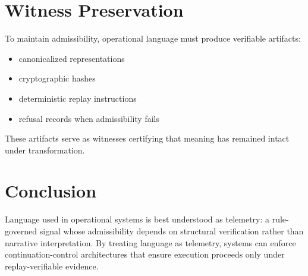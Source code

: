 \documentclass[11pt]{article}
\begin{document}
\section{Witness Preservation}

To maintain admissibility, operational language must produce verifiable artifacts:

\begin{itemize}
\item canonicalized representations
\item cryptographic hashes
\item deterministic replay instructions
\item refusal records when admissibility fails
\end{itemize}

These artifacts serve as witnesses certifying that meaning has remained intact under transformation.

\section{Conclusion}

Language used in operational systems is best understood as telemetry: a rule-governed signal whose admissibility 
depends on structural verification rather than narrative interpretation. 
By treating language as telemetry, systems can enforce continuation-control architectures that ensure execution proceeds 
only under replay-verifiable evidence.
\end{document}
